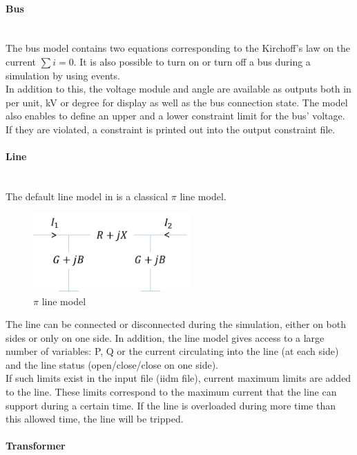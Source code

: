 \documentclass[a4paper, 12pt]{report}
\begin{document}
\paragraph{Bus}
~~\\

The bus model contains two equations corresponding to the Kirchoff's law on the current $\sum i = 0$. It is also possible to turn on or turn off a bus during a simulation by using events. \\
In addition to this, the voltage module and angle are available as outputs both in per unit, kV or degree for display as well as the bus connection state. The model also enables to define an upper and a lower constraint limit for the bus' voltage. If they are violated, a constraint is printed out into the output constraint file. \\

\paragraph{Line}
~~\\

The default line model in \Dynawo is a classical $\pi$ line model.

\begin{figure}[h!]
\centering
\includegraphics[width=60mm]{../resources/PiLine.png}
\caption{$\pi$ line model}
\end{figure}

The line can be connected or disconnected during the simulation, either on both sides or only on one side. In addition, the line model gives access to a large number of variables: P, Q or the current circulating into the line (at each side) and the line status (open/close/close on one side). \\ 
If such limits exist in the input file (iidm file), current maximum limits are added to the line. These limits correspond to the maximum current that the line can support during a certain time. If the line is overloaded during more time than this allowed time, the line will be tripped. \\

\paragraph{Transformer}
~~\\
\end{document}
